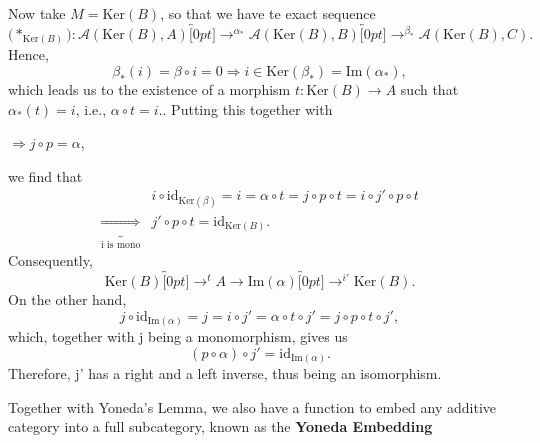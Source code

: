 \documentclass[../category_theory.tex]{subfiles}
\begin{document}
\begin{proof*}
	Now take \(M=\mathrm{Ker}(B)\), so that we have te exact sequence
	\[
		\biggl(*_{\mathrm{Ker}(B)}\biggr):\mathcal{A}(\mathrm{Ker}(B), A)\overbracket[0pt]{\rightarrow}^{\alpha_{*}}\mathcal{A}(\mathrm{Ker}(B), B)\overbracket[0pt]{\rightarrow}^{\beta_{*}} \mathcal{A}(\mathrm{Ker}(B), C).
	\]
	Hence,
	\[
		\beta_{*}(i)=\beta \circ i = 0 \Rightarrow i\in \mathrm{Ker}(\beta_{*})=\mathrm{Im}(\alpha_{*}),
	\]
	which leads us to the existence of a morphism \(t:\mathrm{Ker}(B)\rightarrow A\) such that \(\alpha_{*}(t)=i\), i.e., \(\alpha \circ t = i.\). Putting this together with
	\begin{center}
		 \(\Rightarrow j\circ p = \alpha \),
	\end{center}
	we find that
	\begin{align*}
		                                            & i\circ \mathrm{id}_{\mathrm{Ker}(\beta )} = i = \alpha\circ t = j\circ p\circ t = i\circ j'\circ p\circ t \\
		\underbrace{\Rightarrow}_{\text{i is mono}} & j'\circ p\circ t=\mathrm{id}_{\mathrm{Ker}(B)}.
	\end{align*}
	Consequently,
	\[
		\mathrm{Ker}(B)\overbracket[0pt]{\rightarrow}^{t}A\rightarrow \mathrm{Im}(\alpha )\overbracket[0pt]{\rightarrow}^{i'}\mathrm{Ker}(B).
	\]
	On the other hand,
	\[
		j\circ \mathrm{id}_{\mathrm{Im}(\alpha )} = j = i\circ j'=\alpha \circ t\circ j' = j\circ p\circ t\circ j',
	\]
	which, together with j being a monomorphism, gives us
	\[
		(p\circ \alpha )\circ j'=\mathrm{id}_{\mathrm{Im}(\alpha )}.
	\]
	Therefore, j' has a right and a left inverse, thus being an isomorphism. \qedsymbol
\end{proof*}
Together with Yoneda's Lemma, we also have a function to embed any additive category into a full subcategory, known as the \textbf{Yoneda Embedding}
\end{document}
